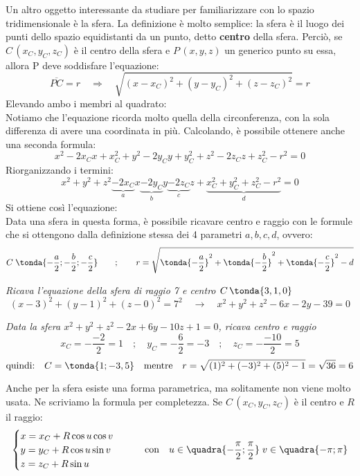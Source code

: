 Un altro oggetto interessante da studiare per familiarizzare con lo spazio tridimensionale è la sfera. La definizione è molto semplice: la sfera è il luogo dei punti dello spazio equidistanti da un punto, detto \textbf{centro} della sfera. Perciò, se \(C\,(x_C,y_C,z_C)\) è il centro della sfera e \(P\,(x,y,z)\) un generico punto su essa, allora P deve soddisfare l'equazione:
\[\overline{PC}=r \quad \Rightarrow \quad \sqrt{(x-x_C)^2+(y-y_C)^2+(z-z_C)^2} = r\]
Elevando ambo i membri al quadrato: \quad {}\\[8pt]
Notiamo che l'equazione ricorda molto quella della circonferenza, con la sola differenza di avere una coordinata in più. Calcolando, è possibile ottenere anche una seconda formula:
\[x^2-2x_C x +x_C^2 +y^2-2y_C y +y_C^2+z^2-2z_C z +z_C^2-r^2=0\]
Riorganizzando i termini:
\[x^2+y^2+z^2\underbrace{-2x_C}_a x\underbrace{-2y_C}_b y\underbrace{-2z_C}_c z+\underbrace{x_C^2+y_C^2+z_C^2-r^2}_d=0\]
Si ottiene così l'equazione: \quad {}\\[8pt]
Data una sfera in questa forma, è possibile ricavare centro e raggio con le formule che si ottengono dalla definizione stessa dei 4 parametri \(a,b,c,d\), ovvero:
\[C\; \tonda{-\frac{a}{2};-\frac{b}{2}; -\frac{c}{2}} \qquad ;\qquad r = \sqrt{\tonda{-\frac{a}{2}}^2+\tonda{-\frac{b}{2}}^2+\tonda{-\frac{c}{2}}^2-d}\]
\begin{esempio}
 \emph{Ricava l'equazione della sfera di raggio 7 e centro \(C\, \tonda{3,1,0}\)}
 \[(x-3)^2+(y-1)^2+(z-0)^2=7^2 \quad \rightarrow \quad x^2+y^2+z^2-6x-2y-39=0\]
\end{esempio}
\begin{esempio}
 \emph{Data la sfera \(x^2+y^2+z^2-2x+6y-10z+1=0\), ricava centro e raggio}
 \[x_C = -\frac{-2}{2}=1 \quad;\quad y_C = -\frac{6}{2}=-3 \quad;\quad z_C = -\frac{-10}{2}=5\]
 \[\text{quindi:}\quad C = \tonda{1;-3,5} \quad \text{mentre}\quad r = \sqrt{(1)^2+(-3)^2+(5)^2-1} = \sqrt{36} = 6\]
\end{esempio}

\begin{osservazione}
 Anche per la sfera esiste una forma parametrica, ma solitamente non viene molto usata. Ne scriviamo la formula per completezza. Se \(C\,(x_C,y_C,z_C)\) è il centro e \(R\) il raggio:
\[\begin{cases}
   x = x_C+R \cos u \cos v \\
   y = y_C+R \cos u \sin v \\
   z = z_C+R \sin u
  \end{cases} \qquad \text{con} \quad u \in \quadra{-\frac{\pi}{2};\frac{\pi}{2}} \; v \in 
\quadra{-\pi;\pi} \]
\end{osservazione}




